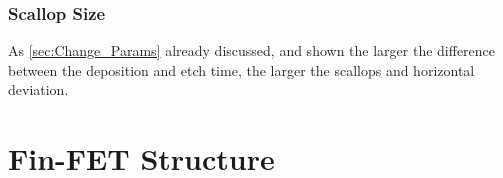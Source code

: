 \documentclass[12pt,a4paper]{article}
\begin{document}
\subsubsection{Scallop Size}
As \autoref{sec:Change_Params} already discussed, and shown the larger the difference between the deposition and etch time, the larger the scallops and horizontal deviation.

\section{Fin-FET Structure}
\end{document}
